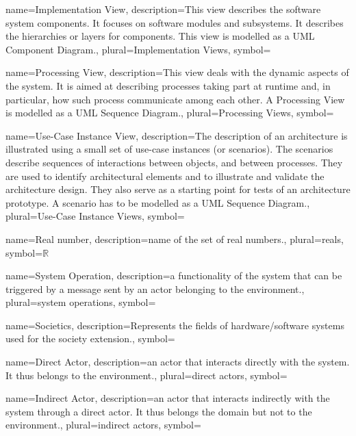 {name={Implementation View},
description={This view describes the software system components. It focuses on
software modules and subsystems. It describes the hierarchies or layers for
components. This view is modelled as a UML Component Diagram.},
plural={Implementation Views}, 
symbol={}
}


{name={Processing View},
description={This view deals with the dynamic aspects of the system. It is
aimed at describing processes taking part at runtime and, in particular, how
such process communicate among each other. A Processing View is modelled as a
UML Sequence Diagram.},
plural={Processing Views}, 
symbol={}
}


{name={Use-Case Instance View},
description={The description of an architecture is illustrated using a small set
of use-case instances (or scenarios). The scenarios describe sequences of
interactions between objects, and between processes. They are used to identify
architectural elements and to illustrate and validate the architecture design.
They also serve as a starting point for tests of an architecture prototype. A
scenario has to be modelled as a UML Sequence Diagram.}, 
plural={Use-Case Instance Views}, 
symbol={}
}

{name={Real number},
description={name of the set of real numbers.},
plural={reals},
symbol={\ensuremath{\mathbb{R}}}
}

{name={System Operation},
description={a functionality of the system that can be triggered by a message
sent by an actor belonging to the environment.}, plural={system operations},
symbol={}
}

{name={Societics},
description={Represents the fields of hardware/software
systems used for the society extension.}, 
symbol={}
}

{name={Direct Actor},
description={an actor that interacts directly with the system. It thus belongs
to the environment.},
plural={direct actors},
symbol={}
}

{name={Indirect Actor},
description={an actor that interacts indirectly with the system through a direct
actor.  It thus belongs the domain but not to the environment.}, 
plural={indirect actors},
symbol={}
}

